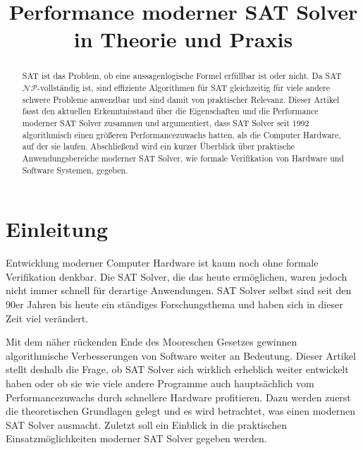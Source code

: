 \documentclass[conference,compsoc,final,a4paper]{IEEEtran}
\newcommand{\autoren}[0]{Arns, Jonathan}
\newcommand{\dokumententitel}[0]{Performance moderner SAT Solver in Theorie und Praxis}
\begin{document}
\title{\dokumententitel}

\author{
  \IEEEauthorblockN{\autoren}
}

\maketitle
\thispagestyle{plain}
\pagestyle{plain}


\begin{abstract}
SAT ist das Problem, ob eine aussagenlogische Formel erfüllbar ist oder nicht. Da SAT $\mathcal{NP}$-vollständig ist, sind effiziente Algorithmen für SAT gleichzeitig für viele andere schwere Probleme anwendbar und sind damit von praktischer Relevanz. Dieser Artikel fasst den aktuellen Erkenntnisstand über die Eigenschaften und die Performance moderner SAT Solver zusammen und argumentiert, dass SAT Solver seit 1992 algorithmisch einen größeren Performancezuwachs hatten, als die Computer Hardware, auf der sie laufen. Abschließend wird ein kurzer Überblick über praktische Anwendungsbereiche moderner SAT Solver, wie formale Verifikation von Hardware und Software Systemen, gegeben.
\end{abstract}

{\small\tableofcontents}

\section{Einleitung}
Entwicklung moderner Computer Hardware ist kaum noch ohne formale Verifikation denkbar. Die SAT Solver, die das heute ermöglichen, waren jedoch nicht immer schnell für derartige Anwendungen. SAT Solver selbst sind seit den 90er Jahren bis heute ein ständiges Forschungsthema und haben sich in dieser Zeit viel verändert. \cite{sat_solving_in_practice_2008}

Mit dem näher rückenden Ende des Mooreschen Gesetzes \cite{50_years_of_moore} gewinnen algorithmische Verbesserungen von Software weiter an Bedeutung.
Dieser Artikel stellt deshalb die Frage, ob SAT Solver sich wirklich erheblich weiter entwickelt haben oder ob sie wie viele andere Programme auch hauptsächlich vom Performancezuwachs durch schnellere Hardware profitieren. Dazu werden zuerst die theoretischen Grundlagen gelegt und es wird betrachtet, was einen modernen SAT Solver ausmacht. Zuletzt soll ein Einblick in die praktischen Einsatzmöglichkeiten moderner SAT Solver gegeben werden.
\end{document}
